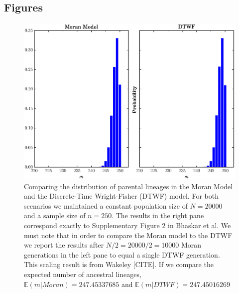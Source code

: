 \documentclass[11pt]{article}
\begin{document}



\newpage

\subsection{Figures}

\begin{center}
	\begin{figure}[!ht]
		\includegraphics[scale=0.85]{../plots/moran_figure1}
		\caption{Comparing the distribution of parental lineages in the Moran Model and the Discrete-Time Wright-Fisher (DTWF) model. For both scenarios we maintained a constant population size of $N = 20000$ and a sample size of $n=250$. The results in the right pane correspond exactly to Supplementary Figure 2 in Bhaskar et al. We must note that in order to compare the Moran model to the DTWF we report the results after $N/2 = 20000/2 = 10000$ Moran generations in the left pane to equal a single DTWF generation. This scaling result is from Wakeley [CITE]. If we compare the expected number of ancestral lineages, $\mathbb{E}(m | Moran) = 247.45337685$ and  $\mathbb{E}(m | DTWF) = 247.45016269$}
	\end{figure}
\end{center}
\end{document}
